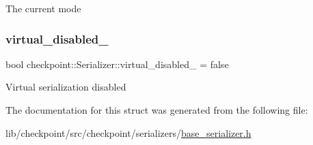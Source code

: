 The current mode \mbox{\label{structcheckpoint_1_1_serializer_a46ef3c0da77d80853882a7cad641c2af}} 
\subsubsection{\texorpdfstring{virtual\+\_\+disabled\+\_\+}{virtual\_disabled\_}}
{\footnotesize\ttfamily bool checkpoint\+::\+Serializer\+::virtual\+\_\+disabled\+\_\+ = false\hspace{0.3cm}{\ttfamily [protected]}}

Virtual serialization disabled 

The documentation for this struct was generated from the following file\+:\begin{DoxyCompactItemize}
\item 
lib/checkpoint/src/checkpoint/serializers/\hyperlink{base__serializer_8h}{base\+\_\+serializer.\+h}\end{DoxyCompactItemize}

